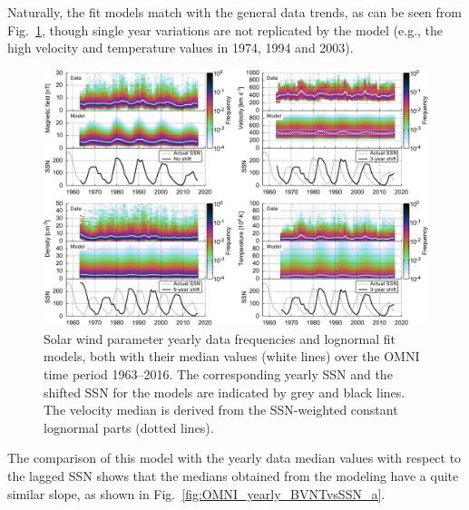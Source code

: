 Naturally, the fit models match with the general data trends, as can be seen from Fig.~\ref{fig:OMNI_yearly_BVdblNTSSN_fit_e_plot}, though single year variations are not replicated by the model (e.g., the high velocity and temperature values in 1974, 1994 and 2003).
\begin{figure}
	\includegraphics[width=18cm]{figures/OMNI_yearly_BVdblNTSSN_fit_e_plot.pdf}
	\caption{Solar wind parameter yearly data frequencies and lognormal fit models, both with their median values (white lines) over the OMNI time period 1963--2016. The corresponding yearly SSN and the shifted SSN for the models are indicated by grey and black lines. The velocity median is derived from the SSN-weighted constant lognormal parts (dotted lines).}
	\label{fig:OMNI_yearly_BVdblNTSSN_fit_e_plot}
\end{figure}
The comparison of this model with the yearly data median values with respect to the lagged SSN shows that the medians obtained from the modeling have a quite similar slope, as shown in Fig.~\ref{fig:OMNI_yearly_BVNTvsSSN_a}.

